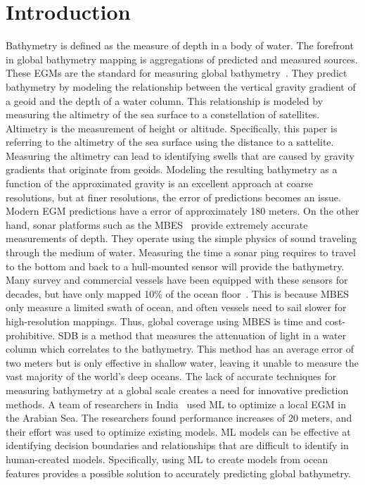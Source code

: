 \section{Introduction}
\setlength{\parindent}{10ex}
Bathymetry is defined as the measure of depth in a body of water.
The forefront in global bathymetry mapping is aggregations of predicted and measured sources. 
These \ac{EGM}s are the standard for measuring global bathymetry~\cite{becker2009global,smith1994bathymetric,smith1997global,smith2010planning}.
They predict bathymetry by modeling the relationship between the vertical gravity gradient of a geoid and the depth of a water column.
This relationship is modeled by measuring the altimetry of the sea surface to a constellation of satellites.
Altimetry is the measurement of height or altitude. 
Specifically, this paper is referring to the altimetry of the sea surface using the distance to a sattelite.
Measuring the altimetry can lead to identifying swells that are caused by gravity gradients that originate from geoids.
Modeling the resulting bathymetry as a function of the approximated gravity is an excellent approach at coarse resolutions, but at finer resolutions, the error of predictions becomes an issue.
Modern \ac{EGM} predictions have a error of approximately 180 meters.
On the other hand, sonar platforms such as the \ac{MBES}~\cite{farr1980multibeam} provide extremely accurate measurements of depth.
They operate using the simple physics of sound traveling through the medium of water.
Measuring the time a sonar ping requires to travel to the bottom and back to a hull-mounted sensor will provide the bathymetry.
Many survey and commercial vessels have been equipped with these sensors for decades, but have only mapped 10\% of the ocean floor~\cite{becker2009global}.
This is because \ac{MBES} only measure a limited swath of ocean, and often vessels need to sail slower for high-resolution mappings.
Thus, global coverage using \ac{MBES} is time and cost-prohibitive.
\ac{SDB} is a method that measures the attenuation of light in a water column which correlates to the bathymetry.
This method has an average error of two meters but is only effective in shallow water, leaving it unable to measure the vast majority of the world's deep oceans.
The lack of accurate techniques for measuring bathymetry at a global scale creates a need for innovative prediction methods.
A team of researchers in India~\cite{jena2012prediction} used \ac{ML} to optimize a local \ac{EGM} in the Arabian Sea.
The researchers found performance increases of 20 meters, and their effort was used to optimize existing models.
\ac{ML} models can be effective at identifying decision boundaries and relationships that are difficult to identify in human-created models.
Specifically, using \ac{ML} to create models from ocean features provides a possible solution to accurately predicting global bathymetry.

